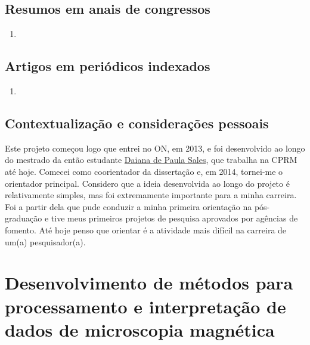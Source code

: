 \subsection*{Resumos em anais de congressos}

\begin{enumerate}
	\item {}
\end{enumerate}

\subsection*{Artigos em periódicos indexados}

\begin{enumerate}
	\item {}
\end{enumerate}

\subsection*{Contextualização e considerações pessoais}

Este projeto começou logo que entrei no ON, em 2013, e foi desenvolvido ao longo do
mestrado da então estudante \href{https://lattes.cnpq.br/7941053288321760}{Daiana de Paula Sales}, que trabalha na CPRM até hoje.
Comecei como coorientador da dissertação e, em 2014, tornei-me o orientador principal.
Considero que a ideia desenvolvida ao longo do projeto é relativamente simples,
mas foi extremamente importante para a minha carreira. Foi a partir dela que pude conduzir a 
minha primeira orientação na pós-graduação e tive meus primeiros projetos de pesquisa
aprovados por agências de fomento. Até hoje penso que orientar 
é a atividade mais difícil na carreira de um(a) pesquisador(a).


\section{Desenvolvimento de métodos para processamento e interpretação de dados de microscopia magnética}
\label{sec:projeto-Andre}

